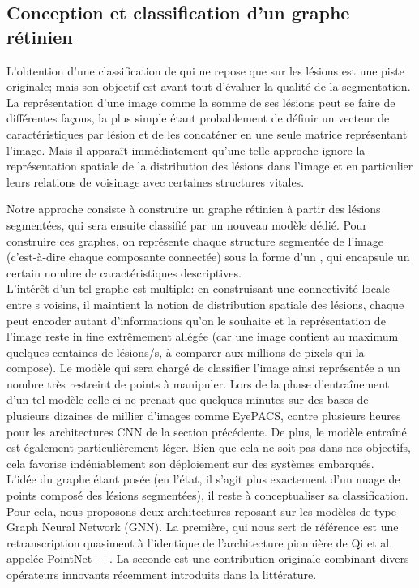 \subsection{Conception et classification d'un graphe rétinien}
L'obtention d'une classification de \fundus{} qui ne repose que sur les lésions est une piste originale; mais son objectif est avant tout d'évaluer la qualité de la segmentation. \\ 
La représentation d'une image comme la somme de ses lésions peut se faire de différentes façons, la plus simple étant probablement de définir un vecteur de caractéristiques par lésion et de les concaténer en une seule matrice représentant l'image. Mais il apparaît immédiatement qu'une telle approche ignore la représentation spatiale de la distribution des lésions dans l'image et en particulier leurs relations de voisinage avec certaines structures vitales.

Notre approche consiste à construire un graphe rétinien à partir des lésions segmentées, qui sera ensuite classifié par un nouveau modèle dédié. Pour construire ces graphes, on représente chaque structure segmentée de l'image (c'est-à-dire chaque composante connectée) sous la forme d'un \noeud, qui encapsule un certain nombre de caractéristiques descriptives.
\\
L'intérêt d'un tel graphe est multiple: en construisant une connectivité locale entre \noeud{}s voisins, il maintient la notion de distribution spatiale des lésions, chaque \noeud{} peut encoder autant d'informations qu'on le souhaite et la représentation de l'image reste in fine extrêmement allégée (car une image contient au maximum quelques centaines de lésions/\noeud s, à comparer aux millions de pixels qui la compose). Le modèle qui sera chargé de classifier l'image ainsi représentée a un nombre très restreint de points à manipuler. Lors de la phase d'entraînement d'un tel modèle celle-ci ne prenait que quelques minutes sur des bases de plusieurs dizaines de millier d'images comme EyePACS, contre plusieurs heures pour les architectures CNN de la section précédente. De plus, le modèle entraîné est également particulièrement léger. Bien que cela ne soit pas dans nos objectifs, cela favorise indéniablement son déploiement sur des systèmes embarqués.
\\
L'idée du graphe étant posée (en l'état, il s'agit plus exactement d'un nuage de points composé des lésions segmentées), il reste à conceptualiser sa classification. Pour cela, nous proposons deux architectures reposant sur les modèles de type Graph Neural Network (GNN). La première, qui nous sert de référence est une retranscription quasiment à l'identique de l'architecture pionnière de Qi et al. \cite{qiPointNetDeepHierarchical2017} appelée PointNet++. La seconde est une contribution originale combinant divers opérateurs innovants récemment introduits dans la littérature.


